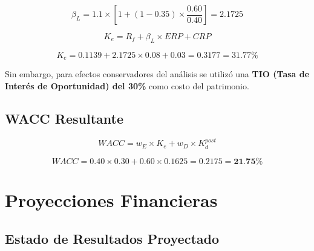\begin{equation}
\beta_L = 1.1 \times \left[1 + (1-0.35) \times \frac{0.60}{0.40}\right] = 2.1725
\end{equation}

\begin{equation}
K_e = R_f + \beta_L \times ERP + CRP
\end{equation}

\begin{equation}
K_e = 0.1139 + 2.1725 \times 0.08 + 0.03 = 0.3177 = 31.77\%
\end{equation}

Sin embargo, para efectos conservadores del análisis se utilizó una \textbf{TIO (Tasa de Interés de Oportunidad) del 30\%} como costo del patrimonio.

\subsection{WACC Resultante}

\begin{equation}
WACC = w_E \times K_e + w_D \times K_d^{post}
\end{equation}

\begin{equation}
WACC = 0.40 \times 0.30 + 0.60 \times 0.1625 = 0.2175 = \textbf{21.75\%}
\end{equation}

\section{Proyecciones Financieras}

\subsection{Estado de Resultados Proyectado}

